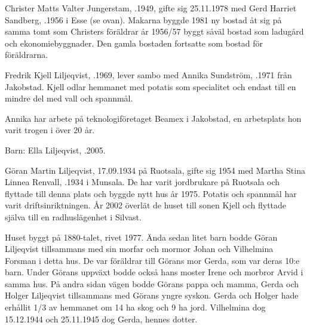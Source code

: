


Christer Matts Valter Jungerstam, .1949, gifte sig 25.11.1978 med Gerd Harriet Sandberg, .1956 i Esse (se ovan). Makarna byggde 1981 ny bostad åt sig på samma tomt som Christers föräldrar år 1956/57  byggt såväl bostad som ladugård och ekonomiebyggnader. Den gamla bostaden fortsatte som bostad för föräldrarna.




Fredrik Kjell Liljeqvist, .1969, lever sambo med Annika Sundström, .1971 från Jakobstad.  Kjell odlar hemmanet med potatis som specialitet och endast till en mindre del med vall och spannmål.

Annika har arbete på teknologiföretaget Beamex i Jakobstad, en arbetsplats hon varit trogen i över 20 år.

Barn: Ella Liljeqvist, .2005.

Göran Martin Liljeqvist, 17.09.1934 på Ruotsala, gifte sig 1954 med Martha Stina Linnea Renvall, .1934 i Munsala. De har varit jordbrukare på Ruotsala och flyttade till denna plats och byggde nytt hus år 1975. Potatis och spannmål har varit driftsinriktningen. År 2002 överlät de huset till sonen Kjell och flyttade själva till en radhuslägenhet i Silvast.
\begin{jhchildren}
  \item {}
  \item {}
  \item {}
  \item {}
\end{jhchildren}




Huset byggt på 1880-talet, rivet 1977. Ända sedan litet barn bodde Göran Liljeqvist tillsammans med sin morfar och mormor Johan och Vilhelmina Forsman i detta hus. De var föräldrar till Görans mor Gerda, som var deras 10:e barn. Under Görans uppväxt bodde också hans moster Irene och morbror Arvid i samma hus. På andra sidan vägen bodde Görans pappa och mamma, Gerda och Holger Liljeqvist tillsammans med Görans yngre syskon. Gerda och Holger hade erhållit 1/3 av hemmanet om 14 ha skog och 9 ha jord. Vilhelmina dog 15.12.1944 och 25.11.1945 dog Gerda, hennes dotter.

